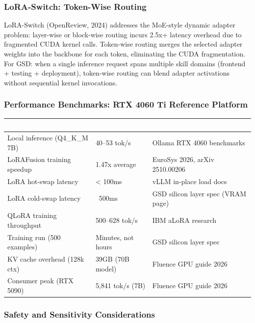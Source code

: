 \documentclass[11pt,letterpaper]{article}
\newcommand{\tableheader}[1]{\textbf{\sffamily\textcolor{white}{#1}}}
\begin{document}
\subsubsection{LoRA-Switch: Token-Wise Routing}

LoRA-Switch (OpenReview, 2024) addresses the MoE-style dynamic adapter problem: layer-wise or block-wise routing incurs 2.5x+ latency overhead due to fragmented CUDA kernel calls. Token-wise routing merges the selected adapter weights into the backbone for each token, eliminating the CUDA fragmentation. For GSD: when a single inference request spans multiple skill domains (frontend + testing + deployment), token-wise routing can blend adapter activations without sequential kernel invocations.

\subsubsection{Performance Benchmarks: RTX 4060 Ti Reference Platform}

\begin{center}
\begin{tabularx}{\textwidth}{L{5cm}C{3cm}L{4cm}}
\toprule
{}
\tableheader{Metric} & \tableheader{Value} & \tableheader{Source} \\
\midrule
Local inference (Q4\_K\_M 7B) & 40--53 tok/s & Ollama RTX 4060 benchmarks \\
LoRAFusion training speedup & 1.47x average & EuroSys 2026, arXiv 2510.00206 \\
LoRA hot-swap latency & < 100ms & vLLM in-place load docs \\
LoRA cold-swap latency & ~500ms & GSD silicon layer spec (VRAM page) \\
QLoRA training throughput & 500--628 tok/s & IBM aLoRA research \\
Training run (500 examples) & Minutes, not hours & GSD silicon layer spec \\
KV cache overhead (128k ctx) & 39GB (70B model) & Fluence GPU guide 2026 \\
Consumer peak (RTX 5090) & 5,841 tok/s (7B) & Fluence GPU guide 2026 \\
\bottomrule
\end{tabularx}
\end{center}

\subsubsection{Safety and Sensitivity Considerations}
\end{document}
